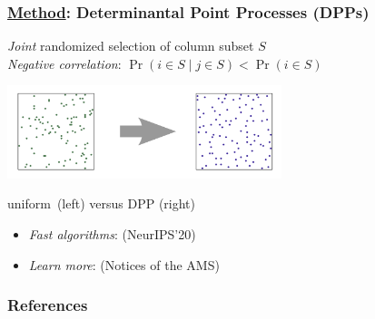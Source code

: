 \documentclass[10pt,handout]{beamer}
\begin{document}
\begin{frame}
  \frametitle{\underline{Method}: Determinantal Point Processes (DPPs)}
\onslide<+->
  \emph{Joint} randomized selection of column subset $S$\\[2mm]

  \onslide<+->
  \emph{Negative correlation}: $\Pr(i\in S\mid j\in S) < \Pr(i\in S)$
  \vspace{-2mm}
  
\begin{center}
  \includegraphics[width=0.6\textwidth]{../figs/gue.png}
  \vspace{-3mm}
  
  \small  uniform~(left) versus DPP (right)%
\end{center}
\vspace{-2mm}
\begin{itemize}
  \item \onslide<+->\emph{Fast algorithms}: \cite{alpha-dpp} (NeurIPS'20)\\[-1mm]
  \item \onslide<+->\emph{Learn more}: \cite{dpps-in-randnla}
    (Notices of the AMS)\\[-1mm]
\end{itemize}
\let\thefootnote\relax{}  
\end{frame}


\begin{frame}[allowframebreaks]
  \frametitle{References}
  \tiny
  
  
\end{frame}

\end{document}
